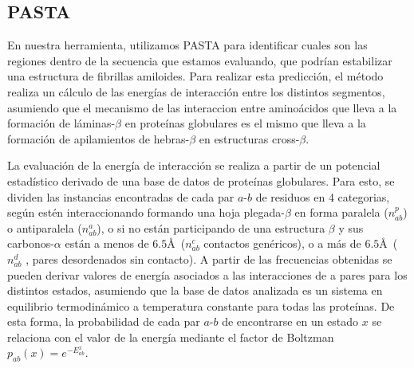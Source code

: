% 








\subsection{PASTA}\label{pasta}

En nuestra herramienta, utilizamos PASTA \cite{trovato2006insight} para identificar cuales son las regiones dentro de la secuencia que estamos evaluando, que podrían estabilizar una estructura de fibrillas amiloides.
Para realizar esta predicción, el método realiza un cálculo de las energías de interacción entre los distintos segmentos, asumiendo que el mecanismo de las interaccion entre aminoácidos que lleva a la formación 
de láminas-$\beta$ en proteínas globulares es el mismo que lleva a la formación de apilamientos de hebras-$\beta$ en estructuras cross-$\beta$.

La evaluación de la energía de interacción se realiza a partir de un potencial estadístico derivado de una base de datos de proteínas globulares.
Para esto, se dividen las instancias encontradas de cada par $a$-$b$ de residuos en 4 categorias, según estén interaccionando formando una hoja plegada-$\beta$ en forma paralela ($n_{ab}^p$) o antiparalela ($n_{ab}^a$), 
o si no están participando de una estructura $\beta$ y sus carbonos-$\alpha$ están a menos de $6.5$\AA~($n_{ab}^c$ contactos genéricos), o a más de $6.5$\AA~($n_{ab}^d$ , pares desordenados sin contacto). 
A partir de las frecuencias obtenidas se pueden derivar valores de energía asociados a las interacciones de a pares para los distintos estados, asumiendo que la base de datos analizada es un sistema en equilibrio termodinámico 
a temperatura constante para todas las proteínas.
De esta forma, la probabilidad de cada par $a$-$b$ de encontrarse en un estado $x$ se relaciona con el valor de la energía mediante el factor de Boltzman $p_{ab}(x)= e^{-E_{ab}^x}$. 

